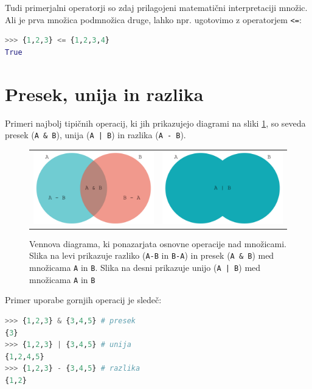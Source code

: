 Tudi primerjalni operatorji so zdaj prilagojeni matematični interpretaciji množic. Ali je prva množica podmnožica druge, lahko npr. ugotovimo z operatorjem \texttt{<=}:
\begin{lstlisting}[language=Python, showstringspaces=false]
>>> {1,2,3} <= {1,2,3,4}
True
\end{lstlisting}

\section{Presek, unija in razlika}

Primeri najbolj tipičnih operacij, ki jih prikazujejo diagrami na sliki \ref{img:mnozice}, so seveda presek (\texttt{A \& B}), unija (\texttt{A | B}) in razlika (\texttt{A - B}).
\begin{figure}
    \centering
    \begin{tabular}{cc}
    \includegraphics[width=0.45\linewidth]{img/mnozice1.pdf} & \includegraphics[width=0.45\linewidth]{img/mnozice2.pdf}\\
    \end{tabular}
    \caption{Vennova diagrama, ki ponazarjata osnovne operacije nad množicami. Slika na levi prikazuje razliko (\texttt{A-B} in \texttt{B-A}) in presek (\texttt{A \& B}) med množicama \texttt{A} in \texttt{B}. Slika na desni prikazuje unijo (\texttt{A | B}) med množicama \texttt{A} in \texttt{B}}
    \label{img:mnozice}
\end{figure}
Primer uporabe gornjih operacij je sledeč:
\begin{lstlisting}[language=Python, showstringspaces=false]
>>> {1,2,3} & {3,4,5} # presek
{3}
>>> {1,2,3} | {3,4,5} # unija
{1,2,4,5}
>>> {1,2,3} - {3,4,5} # razlika
{1,2}
\end{lstlisting}

